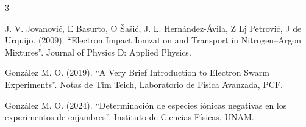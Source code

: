 \begin{thebibliography}{3}


J. V. Jovanović, E Basurto, O Šašić, J. L. Hernández-Ávila, Z Lj Petrović, J de Urquijo. (2009). “Electron Impact Ionization
and Transport in Nitrogen–Argon Mixtures”. Journal of Physics D: Applied Physics.

González M. O. (2019). “A Very Brief Introduction
to Electron Swarm Experiments”. Notas
de Tim Teich, Laboratorio de Física Avanzada,
PCF.

González M. O. (2024). “Determinación de especies iónicas negativas en los experimentos de enjambres”. Instituto de Ciencias Físicas, UNAM. 

\end{thebibliography}